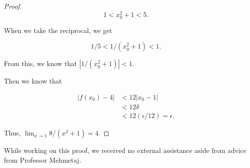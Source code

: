 \documentclass[12pt]{article}
\begin{document}
\begin{proof}
    $$1 < x_0^2 + 1 < 5.$$

    When we take the reciprocal, we get

    $$1/5 < 1/(x_0^2 + 1) < 1.$$

    From this, we know that $|1/(x_0^2 + 1)| < 1$.

    Then we know that

    \begin{align*}
        |f(x_0) - 4| & < 12|x_0 - 1| \\
        & < 12\delta \\
        & < 12(\epsilon / 12) = \epsilon.
    \end{align*}

    Thus, $\lim_{x \to 1} 8/(x^2 + 1) = 4$.
    
\end{proof}

\noindent While working on this proof, we received no external assistance aside from advice from Professor Mehmetaj.
\end{document}
